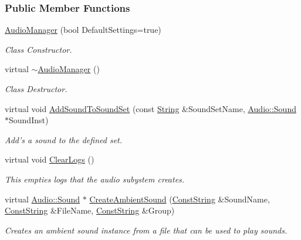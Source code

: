 \subsubsection*{Public Member Functions}
\begin{DoxyCompactItemize}
\item 
\hyperlink{classMezzanine_1_1AudioManager_a30da8ac656fdacf5c420f03304f4e109}{AudioManager} (bool DefaultSettings=true)
\begin{DoxyCompactList}\small\item\em Class Constructor. \item\end{DoxyCompactList}\item 
virtual \hyperlink{classMezzanine_1_1AudioManager_aed11c120ed062fa13a0881099859a957}{$\sim$AudioManager} ()
\begin{DoxyCompactList}\small\item\em Class Destructor. \item\end{DoxyCompactList}\item 
virtual void \hyperlink{classMezzanine_1_1AudioManager_a8db9deed28afb7b07017cb6fd99b624a}{AddSoundToSoundSet} (const \hyperlink{namespaceMezzanine_acf9fcc130e6ebf08e3d8491aebcf1c86}{String} \&SoundSetName, \hyperlink{classMezzanine_1_1Audio_1_1Sound}{Audio::Sound} $\ast$SoundInst)
\begin{DoxyCompactList}\small\item\em Add's a sound to the defined set. \item\end{DoxyCompactList}\item 
virtual void \hyperlink{classMezzanine_1_1AudioManager_a4452ecf4eabfae18e0f6651e35530579}{ClearLogs} ()
\begin{DoxyCompactList}\small\item\em This empties logs that the audio subystem creates. \item\end{DoxyCompactList}\item 
virtual \hyperlink{classMezzanine_1_1Audio_1_1Sound}{Audio::Sound} $\ast$ \hyperlink{classMezzanine_1_1AudioManager_aadb6ab0fd58253567da61c8b3432b104}{CreateAmbientSound} (\hyperlink{namespaceMezzanine_a63cd699ac54b73953f35ec9cfc05e506}{ConstString} \&SoundName, \hyperlink{namespaceMezzanine_a63cd699ac54b73953f35ec9cfc05e506}{ConstString} \&FileName, \hyperlink{namespaceMezzanine_a63cd699ac54b73953f35ec9cfc05e506}{ConstString} \&Group)
\begin{DoxyCompactList}\small\item\em Creates an ambient sound instance from a file that can be used to play sounds. \item\end{DoxyCompactList}\item 

\end{DoxyCompactItemize}
